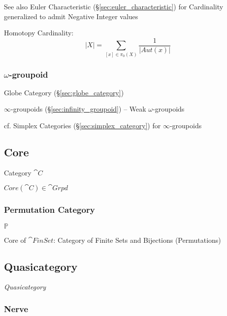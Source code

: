 \fist See also Euler Characteristic (\S\ref{sec:euler_characteristic})
for Cardinality generalized to admit Negative Integer values

Homotopy Cardinality:
\[
  |X| = \sum_{[x] \in \pi_0(X)} \frac{1}{|Aut(x)|}
\] %



\subsubsection{$\omega$-groupoid}\label{sec:omega_groupoid}

Globe Category (\S\ref{sec:globe_category})

$\infty$-groupoids (\S\ref{sec:infinity_groupoid}) -- Weak
$\omega$-groupoids

\fist cf. Simplex Categories (\S\ref{sec:simplex_category}) for
$\infty$-groupoids



\subsection{Core}\label{sec:core}

Category $\cat{C}$

$Core(\cat{C}) \in \cat{Grpd}$



\subsubsection{Permutation Category}\label{sec:permutation_category}

$\mathbb{P}$

Core of $\cat{FinSet}$: Category of Finite Sets and Bijections
(Permutations)



\subsection{Quasicategory}\label{sec:quasicategory}

\emph{Quasicategory}



\subsubsection{Nerve}\label{sec:nerve}

